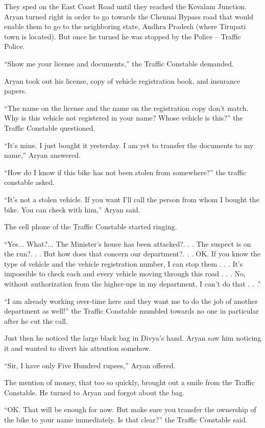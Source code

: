 They sped on the East Coast Road until they reached the Kovalam Junction. Aryan
turned right in order to go towards the Chennai Bypass road that would enable
them to go to the neighboring state, Andhra Pradesh (where Tirupati town is
located). But once he turned he was stopped by the Police – Traffic Police.

“Show me your license and documents,” the Traffic Constable demanded.

Aryan took out his license, copy of vehicle registration book, and insurance
papers.

“The name on the license and the name on the registration copy don't match. Why
is this vehicle not registered in your name? Whose vehicle is this?” the Traffic
Constable questioned.

“It's mine. I just bought it yesterday. I am yet to transfer the documents to my
name,” Aryan answered.

“How do I know if this bike has not been stolen from somewhere?” the traffic
constable asked.

“It's not a stolen vehicle. If you want I'll call the person from whom I bought
the bike. You can check with him,” Aryan said.

The cell phone of the Traffic Constable started ringing.

“Yes... What?... The Minister's house has been attacked?. . . The suspect is on
the run?. . . But how does that concern our department?. . . OK. If you know the
type of vehicle and the vehicle registration number, I can stop them . . . It's
impossible to check each and every vehicle moving through this road . . . No,
without authorization from the higher-ups in my department, I can't do that . .
.”

“I am already working over-time here and they want me to do the job of another
department as well!” the Traffic Constable mumbled towards no one in particular
after he cut the call.

Just then he noticed the large black bag in Divya's hand. Aryan saw him noticing
it and wanted to divert his attention somehow.

“Sir, I have only Five Hundred rupees,” Aryan offered.

The mention of money, that too so quickly, brought out a smile from the Traffic
Constable. He turned to Aryan and forgot about the bag.

“OK. That will be enough for now. But make sure you transfer the ownership of
the bike to your name immediately. Is that clear?” the Traffic Constable said.

